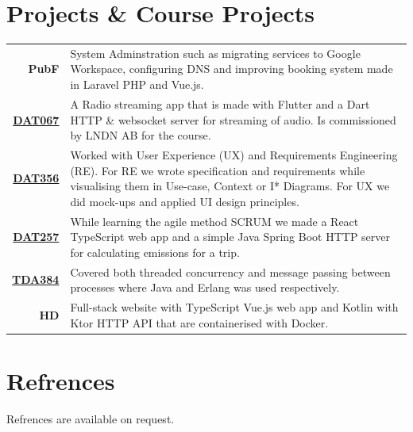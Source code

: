 \documentclass{modernsimplecv}
\begin{document}
\begin{paracol}{2}
\section{Projects \& Course Projects} 
\begin{tabular}{>{\footnotesize\bfseries}r >{\footnotesize}p{}}
    PubF & System Adminstration such as migrating services to Google Workspace, configuring DNS and improving booking system made in Laravel PHP and Vue.js. \vspace{3px} \\
    \href{https://www.student.chalmers.se/sp/course?course_id=34088}{DAT067} & A Radio streaming app that is made with Flutter and a Dart HTTP \& websocket server for streaming of audio. Is commissioned by LNDN AB for the course.  \vspace{3px} \\
    \href{https://www.student.chalmers.se/sp/course?course_id=33536}{DAT356} & Worked with User Experience (UX) and Requirements Engineering (RE). For RE we wrote specification and requirements while visualising them in Use-case, Context or I* Diagrams. For UX we did mock-ups and applied UI design principles. \vspace{3px} \\
    \href{https://www.student.chalmers.se/sp/course?course_id=34092}{DAT257} & While learning the agile method SCRUM we made a React TypeScript web app and a simple Java Spring Boot HTTP server for calculating emissions for a trip.\vspace{3px} \\
    \href{https://www.student.chalmers.se/sp/course?course_id=34004}{TDA384} & Covered both threaded concurrency and message passing between processes where Java and Erlang was used respectively. \vspace{3px} \\
    HD & Full-stack website with TypeScript Vue.js web app and Kotlin with Ktor HTTP API that are containerised with Docker. \vspace{3px} \\
    
\end{tabular}

\section{Refrences}
Refrences are available on request.




\end{paracol}
\end{document}
